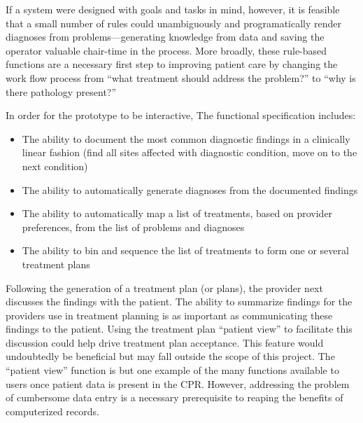 \documentclass[11pt]{article}
\begin{document}
If a system were designed with goals and tasks in mind, however, it is feasible that a small number of rules could unambiguously and programatically render diagnoses from problems---generating knowledge from data and saving the operator valuable chair-time in the process. More broadly, these rule-based functions are a necessary first step to improving patient care by changing the work flow process from ``what treatment should address the problem?'' to ``why is there pathology present?''


In order for the prototype to be interactive, The functional specification includes:

\begin{itemize}
\item The ability to document the most common diagnostic findings in a clinically linear fashion (find all sites affected with diagnostic condition, move on to the next condition)
\item The ability to automatically generate diagnoses from the documented findings
\item The ability to automatically map a list of treatments, based on provider preferences, from the list of problems and diagnoses
\item The ability to bin and sequence the list of treatments to form one or several treatment plans
\end{itemize}

Following the generation of a treatment plan (or plans), the provider next discusses the findings with the patient. The ability to summarize findings for the providers use in treatment planning is as important as communicating these findings to the patient. Using the treatment plan ``patient view'' to facilitate this discussion could help drive treatment plan acceptance. This feature would undoubtedly be beneficial but may fall outside the scope of this project. The ``patient view'' function is but one example of the many functions available to users once patient data is present in the CPR. However, addressing the problem of cumbersome data entry is a necessary prerequisite to reaping the benefits of computerized records.
\end{document}
